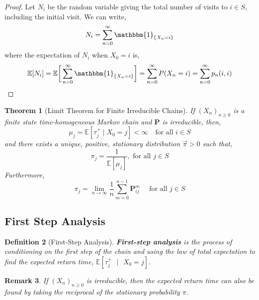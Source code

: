 \documentclass{tufte-handout}
\newtheorem{thm}{Theorem}
\newtheorem{defn}[thm]{Definition}
\newtheorem{rmk}[thm]{Remark}
\begin{document}
  \begin{proof}
    Let $N_i$ be the random variable giving the total number of visits to $i \in S$, including the initial visit. We can write,
    \[N_i = \sum_{n=0}^\infty \mathbbm{1}_{\{X_n = i\}}\]
    \noindent where the expectation of $N_i$ when $X_0 = i$ is,
    \[\mathbb{E}[N_i] = \mathbb{E}\bigg[\sum_{n=0}^\infty \mathbbm{1}_{\{X_n = i\}}\bigg] = \sum_{n=0}^\infty P(X_n = i) = \sum_{n=0}^\infty p_n(i,i)\]
  \end{proof}

  \begin{thm}[Limit Theorem for Finite Irreducible Chains]
      If $(X_n)_{n \geq 0}$ is a finite state time-homogeneous Markov chain and $\boldsymbol{P}$ is irreducible, then,
      \[\mu_j = \mathbb{E}[\tau^+_j \mid X_0 = j] < \infty \quad \text{for all $i \in S$}\]
      \noindent and there exists a unique, positive, stationary distribution $\Vec{\pi} > 0$ such that,
      \[\pi_{j}=\frac{1}{\mathbb{E}[\mu_j]}, \text { for all } j \in S\]
      \noindent Furthermore,
      \[\pi_{j}=\lim _{n \rightarrow \infty} \frac{1}{n} \sum_{m=0}^{n-1} \boldsymbol{P}_{i j}^{m} \quad \text { for all } j \in S\]
  \end{thm}

  \subsection{First Step Analysis}
  \begin{defn}[First-Step Analysis]
    \textbf{First-step analysis} is the process of conditioning on the first step of the chain and using the law of total expectation to find the expected return time, $\mathbb{E}[\tau^+_j \text{ $|$ } X_0 = j]$.
  \end{defn}

  \begin{rmk}
    If $(X_n)_{n \geq 0}$ is irreducible, then the expected return time can also be found by taking the reciprocal of the stationary probability $\pi$.
  \end{rmk}
\end{document}
